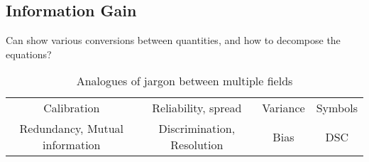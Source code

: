\documentclass[draft]{ametsoc}
\begin{document}
\subsection{Information Gain}
Can show various conversions between quantities, and how to decompose the equations?



%
%
%




%
\begin{table}[t]
\caption{Analogues of jargon between multiple fields}\label{tab:jargon}
\begin{center}
\begin{tabular}{cccc}
\hline
Calibration & Reliability, spread & Variance & Symbols \\
Redundancy, Mutual information & Discrimination, Resolution & Bias & DSC \\
\hline
\end{tabular}
\end{center}
\end{table}
\end{document}
